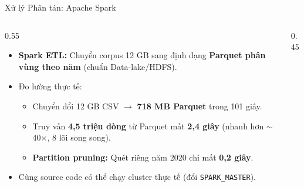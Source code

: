 \documentclass[aspectratio=169, 10pt]{beamer}
\begin{document}
\begin{frame}{Xử lý Phân tán: Apache Spark}
    \begin{columns}
        \begin{column}{0.55\textwidth}
            \begin{itemize}
                \item \textbf{Spark ETL:} Chuyển corpus 12 GB sang định dạng \textbf{Parquet phân vùng theo năm} (chuẩn Data-lake/HDFS).
                \item Đo lường thực tế:
                \begin{itemize}
                    \item Chuyển đổi 12 GB CSV $\rightarrow$ \textbf{718 MB Parquet} trong 101 giây.
                    \item Truy vấn \textbf{4,5 triệu dòng} từ Parquet mất \textbf{2,4 giây} (nhanh hơn $\sim$40$\times$, 8 lõi song song).
                    \item \textbf{Partition pruning:} Quét riêng năm 2020 chỉ mất \textbf{0,2 giây}.
                \end{itemize}
                \item Cùng source code có thể chạy cluster thực tế (đổi \texttt{SPARK\_MASTER}).
            \end{itemize}
        \end{column}
        \begin{column}{0.45\textwidth}
            \centering
        \end{column}
    \end{columns}
\end{frame}
\end{document}
